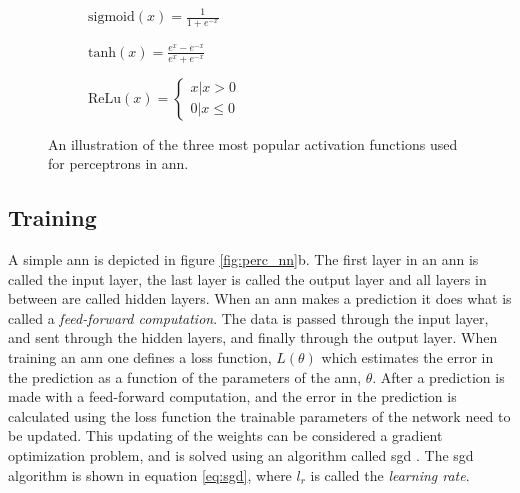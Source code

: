 \begin{figure}[H]
    \centering
    \begin{subfigure}[b]{0.32\textwidth}
        \centering
        
        \caption{$\mathrm{sigmoid}(x) = \frac{1}{1+e^{-x}}$}
        \label{fig:sigmoid}
    \end{subfigure}
    \begin{subfigure}[b]{0.32\textwidth}
        \centering
        
        \caption{$\mathrm{tanh}(x) = \frac{e^{x}-e^{-x}}{e^{x}+e^{-x}}$}
        \label{fig:tanh}
    \end{subfigure}
    \begin{subfigure}[b]{0.32\textwidth}
        \centering
        
        \caption{$\mathrm{ReLu}(x) = \left\{\begin{matrix}x | x>0\\ 0 | x \leq 0\end{matrix}\right.$}
        \label{fig:relu}
    \end{subfigure}
    \caption{An illustration of the three most popular activation functions used for perceptrons in \acrshort{ann}.}
    \label{fig:obj_funcs}
\end{figure}

\subsection{Training} \label{sec:nn_training}
A simple \acrshort{ann} is depicted in figure \ref{fig:perc_nn}b. The first layer in an \acrshort{ann} is called the input layer, the last layer is called the output layer and all layers in between are called hidden layers. When an \acrshort{ann} makes a prediction it does what is called a \textit{feed-forward computation}. The data is passed through the input layer, and sent through the hidden layers, and finally through the output layer. When training an \acrshort{ann} one defines a loss function, $L(\theta)$ which estimates the error in the prediction as a function of the parameters of the \acrshort{ann}, $\theta$. After a prediction is made with a feed-forward computation, and the error in the prediction is calculated using the loss function the trainable parameters of the network need to be updated. This updating of the weights can be considered a gradient optimization problem, and is solved using an algorithm called \acrfull{sgd} \cite{dl_book}. The \acrshort{sgd} algorithm is shown in equation \eqref{eq:sgd}, where $l_r$ is called the \textit{learning rate}.

